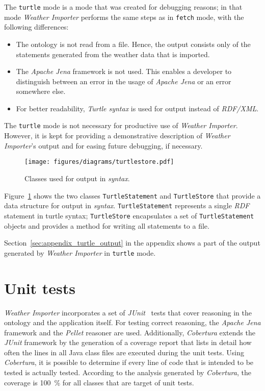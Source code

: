 The \texttt{turtle} mode is a mode that was created for debugging reasons; in that mode \emph{Weather Importer} performs the same steps as in \texttt{fetch} mode, with the following differences:
\begin{itemize}
  \item The \smarthomeweather ontology is not read from a file. Hence, the output consists only of the statements generated from the weather data that is imported.
  \item The \emph{Apache Jena} framework is not used. This enables a developer to distinguish between an error in the usage of \emph{Apache Jena} or an error somewhere else.
  \item For better readability, \emph{\acs{Turtle} syntax} is used for output instead of \emph{RDF/XML}.
\end{itemize}

The \texttt{turtle} mode is not necessary for productive use of \emph{Weather Importer}. However, it is kept for providing a demonstrative description of \emph{Weather Importer}'s output and for easing future debugging, if necessary.

\begin{figure}
\centering
\texttt{[image: figures/diagrams/turtlestore.pdf]}
\caption[Classes used for output in \emph{ syntax}]{Classes used for output in \emph{ syntax}.}
\label{fig:importer_turtlestore}
\end{figure}

Figure~\ref{fig:importer_turtlestore} shows the two classes \texttt{TurtleStatement} and \texttt{TurtleStore} that provide a data structure for output in \emph{ syntax}. \texttt{TurtleStatement} represents a single \emph{RDF} statement in turtle syntax; \texttt{TurtleStore} encapsulates a set of \texttt{TurtleStatement} objects and provides a method for writing all statements to a file.

Section~\ref{sec:appendix_turtle_output} in the appendix shows a part of the output generated by \emph{Weather Importer} in \texttt{turtle} mode.

\section{Unit tests}
\label{sec:importer_tests}

\emph{Weather Importer} incorporates a set of \emph{JUnit}~\cite{junit} tests that cover reasoning in the \smarthomeweather ontology and the application itself. For testing correct reasoning, the \emph{Apache Jena} framework and the \emph{Pellet} reasoner are used. Additionally, \emph{Cobertura} extends the \emph{JUnit} framework by the generation of a coverage report that lists in detail how often the lines in all Java class files are executed during the unit tests. Using \emph{Cobertura}, it is possible to determine if every line of code that is intended to be tested is actually tested. According to the analysis generated by \emph{Cobertura}, the coverage is \num{100}~\% for all classes that are target of unit tests.


